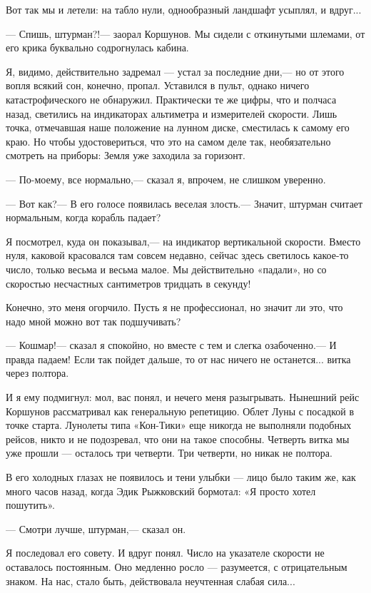 \documentclass[11pt,a4paper,oneside]{article}
\begin{document}
Вот так мы и летели: на табло нули, однообразный ландшафт усыплял, и вдруг...

— Спишь, штурман?!— заорал Коршунов. Мы сидели с откинутыми шлемами, от его крика буквально содрогнулась кабина.

Я, видимо, действительно задремал — устал за последние дни,— но от этого вопля всякий сон, конечно, пропал. Уставился в пульт, однако ничего катастрофического не обнаружил. Практически те же цифры, что и полчаса назад, светились на индикаторах альтиметра и измерителей скорости. Лишь точка, отмечавшая наше положение на лунном диске, сместилась к самому его краю. Но чтобы удостовериться, что это на самом деле так, необязательно смотреть на приборы: Земля уже заходила за горизонт.

— По-моему, все нормально,— сказал я, впрочем, не слишком уверенно.

— Вот как?— В его голосе появилась веселая злость.— Значит, штурман считает нормальным, когда корабль падает?

Я посмотрел, куда он показывал,— на индикатор вертикальной скорости. Вместо нуля, каковой красовался там совсем недавно, сейчас здесь светилось какое-то число, только весьма и весьма малое. Мы действительно «падали», но со скоростью несчастных сантиметров тридцать в секунду!

Конечно, это меня огорчило. Пусть я не профессионал, но значит ли это, что надо мной можно вот так подшучивать?

— Кошмар!— сказал я спокойно, но вместе с тем и слегка озабоченно.— И правда падаем! Если так пойдет дальше, то от нас ничего не останется... витка через полтора.

И я ему подмигнул: мол, вас понял, и нечего меня разыгрывать. Нынешний рейс Коршунов рассматривал как генеральную репетицию. Облет Луны с посадкой в точке старта. Лунолеты типа «Кон-Тики» еще никогда не выполняли подобных рейсов, никто и не подозревал, что они на такое способны. Четверть витка мы уже прошли — осталось три четверти. Три четверти, но никак не полтора.

В его холодных глазах не появилось и тени улыбки — лицо было таким же, как много часов назад, когда Эдик Рыжковский бормотал: «Я просто хотел пошутить».

— Смотри лучше, штурман,— сказал он.

Я последовал его совету. И вдруг понял. Число на указателе скорости не оставалось постоянным. Оно медленно росло — разумеется, с отрицательным знаком. На нас, стало быть, действовала неучтенная слабая сила...
\end{document}
